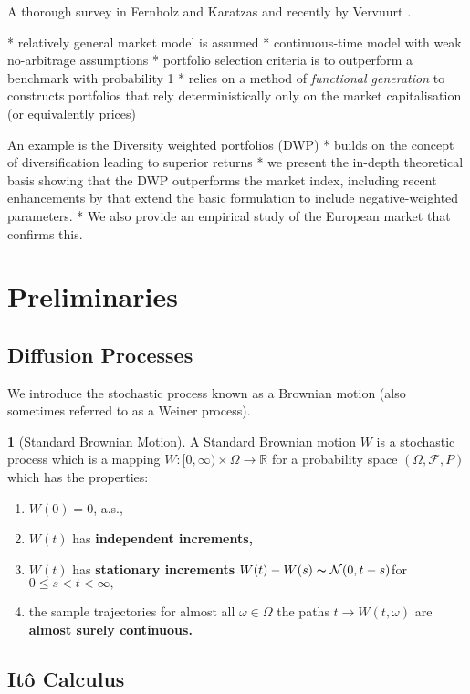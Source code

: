 \documentclass[british]{amsart}
\numberwithin{equation}{section}
\numberwithin{figure}{section}
\theoremstyle{plain}
\theoremstyle{definition}
\newtheorem{defn}[thm]{\protect\definitionname}
\theoremstyle{plain}
\theoremstyle{plain}
\theoremstyle{plain}
\providecommand{\definitionname}{Definition}
\begin{document}
A thorough survey in Fernholz and Karatzas \cite{karatzas2009} and recently
by Vervuurt \cite{vervuurt2015}.

* relatively general market model is assumed
* continuous-time model with weak no-arbitrage assumptions
* portfolio selection criteria is to outperform a benchmark with probability 1
* relies on a method of \textit{functional generation} to constructs portfolios
that rely deterministically only on the market capitalisation (or equivalently 
prices)

An example is the Diversity weighted portfolios (DWP)
* builds on the concept of diversification leading to superior returns
* we present the in-depth theoretical basis showing that the DWP outperforms the 
market index, including recent enhancements by \cite{vervuurt2016} that
extend the basic formulation to include negative-weighted parameters.
* We also provide an empirical study of the European market that confirms this.

\section{Preliminaries}
\subsection{Diffusion Processes}

We introduce the stochastic process known as a Brownian motion (also sometimes 
referred to as a Weiner process).

\begin{defn}[Standard Brownian Motion]
A Standard Brownian motion $W$ is a stochastic process which is a mapping 
$W:[0,\infty)\times\Omega\to\mathbb{R}$ for a probability
space $(\Omega,\mathcal{F},P)$ which has the properties:

\begin{enumerate}
	\item $W(0)=0$, a.s.,
	\item $W(t)$ has \textbf{independent increments,}
	\item $W(t)$ has \textbf{stationary increments} 
		$W(t)-W(s)\thicksim\mathcal{N}(0,t-s)$for $0\le s<t<\infty,$
	\item the sample trajectories for almost all $\omega\in\Omega$ the paths 
		$t\to W(t,\omega)$ are \textbf{almost surely continuous.}
\end{enumerate}
\end{defn}

\subsection{It\^{o} Calculus}
\end{document}
